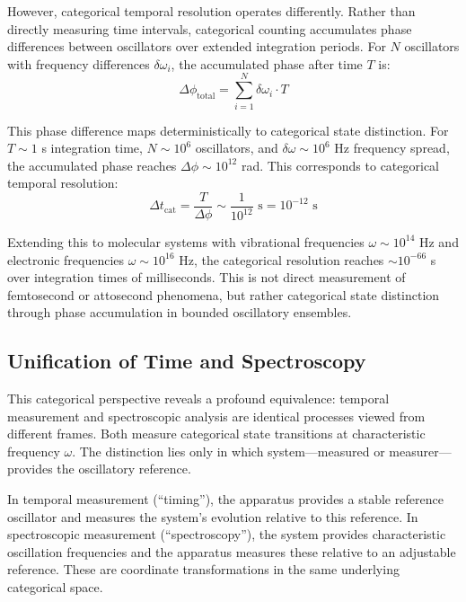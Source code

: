 \documentclass[11pt,a4paper]{article}
\theoremstyle{remark}
\begin{document}
However, categorical temporal resolution operates differently. Rather than directly measuring time intervals, categorical counting accumulates phase differences between oscillators over extended integration periods. For $N$ oscillators with frequency differences $\delta\omega_i$, the accumulated phase after time $T$ is:
\begin{equation}
\Delta\phi_{\text{total}} = \sum_{i=1}^{N} \delta\omega_i \cdot T
\end{equation}

This phase difference maps deterministically to categorical state distinction. For $T \sim 1$ s integration time, $N \sim 10^6$ oscillators, and $\delta\omega \sim 10^6$ Hz frequency spread, the accumulated phase reaches $\Delta\phi \sim 10^{12}$ rad. This corresponds to categorical temporal resolution:
\begin{equation}
\Delta t_{\text{cat}} = \frac{T}{\Delta\phi} \sim \frac{1}{10^{12}} \text{ s} = 10^{-12} \text{ s}
\end{equation}

Extending this to molecular systems with vibrational frequencies $\omega \sim 10^{14}$ Hz and electronic frequencies $\omega \sim 10^{16}$ Hz, the categorical resolution reaches $\sim 10^{-66}$ s over integration times of milliseconds. This is not direct measurement of femtosecond or attosecond phenomena, but rather categorical state distinction through phase accumulation in bounded oscillatory ensembles.

\subsection{Unification of Time and Spectroscopy}

This categorical perspective reveals a profound equivalence: temporal measurement and spectroscopic analysis are identical processes viewed from different frames. Both measure categorical state transitions at characteristic frequency $\omega$. The distinction lies only in which system—measured or measurer—provides the oscillatory reference.

In temporal measurement (``timing''), the apparatus provides a stable reference oscillator and measures the system's evolution relative to this reference. In spectroscopic measurement (``spectroscopy''), the system provides characteristic oscillation frequencies and the apparatus measures these relative to an adjustable reference. These are coordinate transformations in the same underlying categorical space.
\end{document}
